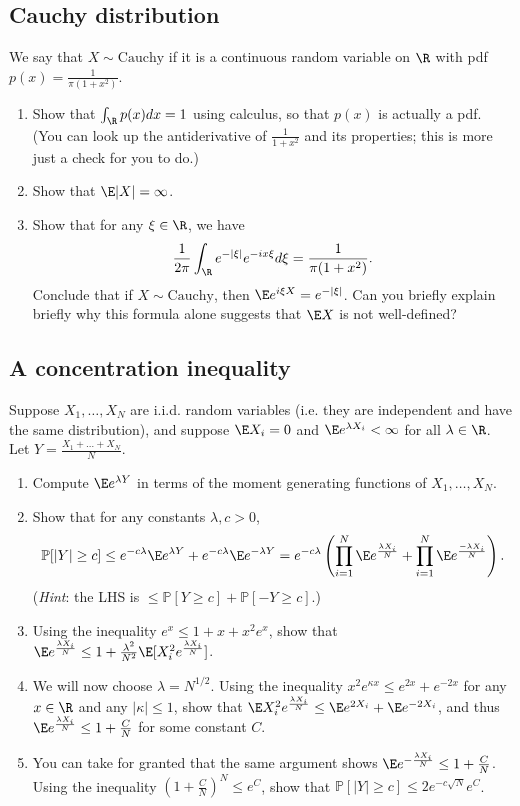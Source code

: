 \documentclass[12pt,reqno]{amsart}
\theoremstyle{definition}
\theoremstyle{remark}
\numberwithin{equation}{section}
\begin{document}
\subsection{Cauchy distribution}
We say that $X\sim\mathrm{Cauchy}$ if it is a continuous random variable on $\R$ with pdf $p(x)=\frac{1}{\pi(1+x^{2})}$.
\begin{enumerate}
\item Show that $\int_{\R}p(x)dx=1$ using calculus, so that $p(x)$ is actually a pdf. (You can look up the antiderivative of $\frac{1}{1+x^{2}}$ and its properties; this is more just a check for you to do.)
\item Show that $\E|X|=\infty$.
\item Show that for any $\xi\in\R$, we have 
%
\begin{align*}
\frac{1}{2\pi}\int_{\R}e^{-|\xi|}e^{-ix\xi}d\xi=\frac{1}{\pi(1+x^{2})}.
\end{align*}
%
Conclude that if $X\sim\mathrm{Cauchy}$, then $\E e^{i\xi X}=e^{-|\xi|}$. Can you briefly explain briefly why this formula alone suggests that $\E X$ is not well-defined?
\end{enumerate}
\subsection{A concentration inequality}\label{subsection:concentration}
Suppose $X_{1},\ldots,X_{N}$ are i.i.d. random variables (i.e. they are independent and have the same distribution), and suppose $\E X_{i}=0$ and $\E e^{\lambda X_{i}}<\infty$ for all $\lambda\in\R$. Let $Y=\frac{X_{1}+\ldots+X_{N}}{N}$.
\begin{enumerate}
\item Compute $\E e^{\lambda Y}$ in terms of the moment generating functions of $X_{1},\ldots,X_{N}$.
\item Show that for any constants $\lambda,c>0$,
%
\begin{align*}
\mathbb{P}[|Y|\geq c]\leq e^{-c\lambda}\E e^{\lambda Y}+e^{-c\lambda}\E e^{-\lambda Y}=e^{-c\lambda}\left(\prod_{i=1}^{N}\E e^{\frac{\lambda X_{i}}{N}}+\prod_{i=1}^{N}\E e^{\frac{-\lambda X_{i}}{N}}\right).
\end{align*}
%
(\emph{Hint}: the LHS is $\leq\mathbb{P}[Y\geq c]+\mathbb{P}[-Y\geq c]$.)
\item Using the inequality $e^{x}\leq1+x+x^{2}e^{x}$, show that $\E e^{\frac{\lambda X_{i}}{N}}\leq1+\frac{\lambda^{2}}{N^{2}}\E[X_{i}^{2}e^{\frac{\lambda X_{i}}{N}}]$.
\item We will now choose $\lambda=N^{1/2}$. Using the inequality $x^{2}e^{\kappa x}\leq e^{2x}+e^{-2x}$ for any $x\in\R$ and any $|\kappa|\leq1$, show that $\E X_{i}^{2}e^{\frac{\lambda X_{i}}{N}}\leq\E e^{2X_{i}}+\E e^{-2X_{i}}$, and thus $\E e^{\frac{\lambda X_{i}}{N}}\leq 1+\frac{C}{N}$ for some constant $C$.
\item You can take for granted that the same argument shows $\E e^{-\frac{\lambda X_{i}}{N}}\leq 1+\frac{C}{N}$. Using the inequality $(1+\frac{C}{N})^{N}\leq e^{C}$, show that $\mathbb{P}[|Y|\geq c]\leq2e^{-c\sqrt{N}}e^{C}$.
\end{enumerate}
\end{document}

